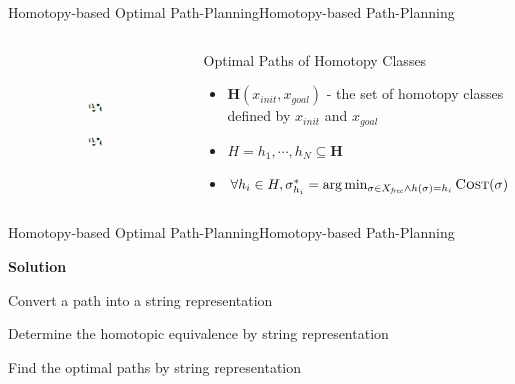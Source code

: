 \begin{frame}{Homotopy-based Optimal Path-Planning}{Homotopy-based Path-Planning}
\begin{columns}
\begin{figure}
\begin{subfigure}
	\end{subfigure}
	\\
	\begin{subfigure}
		\centering
		\includegraphics[width=.47\textwidth]{figure/all_homotopy_classes/s5.png}
	\end{subfigure}	 
	\begin{subfigure}
		\centering
		\includegraphics[width=.47\textwidth]{figure/all_homotopy_classes/s6.png}
	\end{subfigure}	 
\end{figure}
\begin{block}{Optimal Paths of Homotopy Classes}
\begin{itemize}
\item $ \bm{H} ( x_{init}, x_{goal} ) $ - the set of homotopy classes defined by $ x_{init} $ and $ x_{goal} $
\item $ H = { h_1 , \cdots , h_N } \subseteq \bm{H} $
\item $ \forall h_i \in H, \sigma^{*}_{h_i} = \arg \min_{\sigma \in X_{\it free} \land h(\sigma) = h_i } \mbox{\sc Cost}  (\sigma) $
\end{itemize}
\end{block}
\end{columns}
	
\end{frame}

\begin{frame}{Homotopy-based Optimal Path-Planning}{Homotopy-based Path-Planning}

{\bf Solution}

\begin{block}{}
Convert a path into a string representation
\end{block}
\begin{block}{}
Determine the homotopic equivalence by string representation
\end{block}
\begin{block}{}
Find the optimal paths by string representation
\end{block}

\end{frame}

